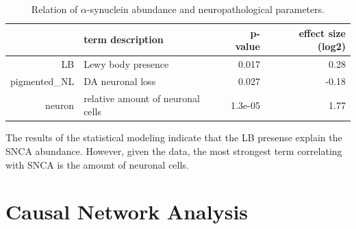 \documentclass[11pt]{article}\usepackage[]{graphicx}\usepackage[usenames,dvipsnames]{color}
\begin{document}
\begin{table}[ht]
\centering
\begin{tabular}{rlrr}
  \hline
 & term description & p-value & effect size (log2) \\ 
  \hline
LB & Lewy body presence & 0.017 & 0.28 \\ 
  pigmented\_NL & DA neuronal loss & 0.027 & -0.18 \\ 
  neuron & relative amount of neuronal cells & 1.3e-05 & 1.77 \\ 
   \hline
\end{tabular}
\caption{{\color{darkgray} Relation of $\alpha$-synuclein abundance 
and neuropathological parameters.}} 
\end{table}


The results of the statistical modeling indicate that the LB presense 
explain the SNCA abundance. However, given the data, the most strongest
term correlating with SNCA is the amount of neuronal cells.




\section{Causal Network Analysis}







\clearpage
\end{document}
